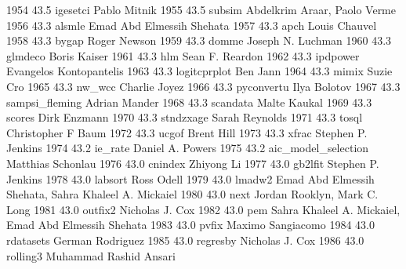   1954     43.5    igesetci      Pablo Mitnik                            
  1955     43.5    subsim        Abdelkrim Araar, Paolo Verme            
  1956     43.3    alsmle        Emad Abd Elmessih Shehata               
  1957     43.3    apch          Louis Chauvel                           
  1958     43.3    bygap         Roger Newson                            
  1959     43.3    domme         Joseph N. Luchman                       
  1960     43.3    glmdeco       Boris Kaiser                            
  1961     43.3    hlm           Sean F. Reardon                         
  1962     43.3    ipdpower      Evangelos Kontopantelis                 
  1963     43.3    logitcprplot  Ben Jann                                
  1964     43.3    mimix         Suzie Cro                               
  1965     43.3    nw_wcc        Charlie Joyez                           
  1966     43.3    pyconvertu    Ilya Bolotov                            
  1967     43.3    sampsi_fleming  Adrian Mander                           
  1968     43.3    scandata      Malte Kaukal                            
  1969     43.3    scores        Dirk Enzmann                            
  1970     43.3    stndzxage     Sarah Reynolds                          
  1971     43.3    tosql         Christopher F Baum                      
  1972     43.3    ucgof         Brent Hill                              
  1973     43.3    xfrac         Stephen P. Jenkins                      
  1974     43.2    ie_rate       Daniel A. Powers                        
  1975     43.2    aic_model_selection  Matthias Schonlau                       
  1976     43.0    cnindex       Zhiyong Li                              
  1977     43.0    gb2lfit       Stephen P. Jenkins                      
  1978     43.0    labsort       Ross Odell                              
  1979     43.0    lmadw2        Emad Abd Elmessih Shehata, Sahra        
                                   Khaleel A. Mickaiel                     
  1980     43.0    next          Jordan Rooklyn, Mark C. Long            
  1981     43.0    outfix2       Nicholas J. Cox                         
  1982     43.0    pem           Sahra Khaleel A. Mickaiel, Emad Abd     
                                   Elmessih Shehata                        
  1983     43.0    pvfix         Maximo Sangiacomo                       
  1984     43.0    rdatasets     German Rodriguez                        
  1985     43.0    regresby      Nicholas J. Cox                         
  1986     43.0    rolling3      Muhammad Rashid Ansari                  
